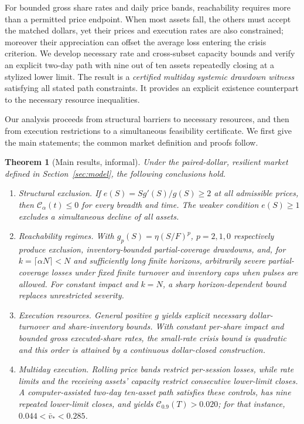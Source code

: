 \documentclass[11pt]{article}
\numberwithin{equation}{section}
\newtheorem{theorem}{Theorem}[section]
\theoremstyle{definition}
\theoremstyle{remark}
\newcommand{\Cris}{\mathcal{C}}
\begin{document}
For bounded gross share rates and daily price bands, reachability requires more than a permitted price endpoint. When most assets fall, the others must accept the matched dollars, yet their prices and execution rates are also constrained; moreover their appreciation can offset the average loss entering the crisis criterion. We develop necessary rate and cross-subset capacity bounds and verify an explicit two-day path with nine out of ten assets repeatedly closing at a stylized lower limit. The result is a \emph{certified multiday systemic drawdown witness} satisfying all stated path constraints. It provides an explicit existence counterpart to the necessary resource inequalities.

Our analysis proceeds from structural barriers to necessary resources, and then from execution restrictions to a simultaneous feasibility certificate. We first give the main statements; the common market definition and proofs follow.

\begin{theorem}[Main results, informal]\label{thm:informal}
Under the paired-dollar, resilient market defined in Section~\ref{sec:model}, the following conclusions hold.
\begin{enumerate}[label=\textup{(\roman*)},leftmargin=2em,itemsep=0.12em]
\item \emph{Structural exclusion.} If $e(S)=Sg'(S)/g(S)\ge2$ at all admissible prices, then $\Cris_\alpha(t)\le0$ for every breadth and time. The weaker condition $e(S)\ge1$ excludes a simultaneous decline of all assets.
\item \emph{Reachability regimes.} With $g_p(S)=\eta(S/F)^p$, $p=2,1,0$ respectively produce exclusion, inventory-bounded partial-coverage drawdowns, and, for $k=\lceil\alpha N\rceil<N$ and sufficiently long finite horizons, arbitrarily severe partial-coverage losses under fixed finite turnover and inventory caps when pulses are allowed. For constant impact and $k=N$, a sharp horizon-dependent bound replaces unrestricted severity.
\item \emph{Execution resources.} General positive $g$ yields explicit necessary dollar-turnover and share-inventory bounds. With constant per-share impact and bounded gross executed-share rates, the small-rate crisis bound is quadratic and this order is attained by a continuous dollar-closed construction.
\item \emph{Multiday execution.} Rolling price bands restrict per-session losses, while rate limits and the receiving assets' capacity restrict consecutive lower-limit closes. A computer-assisted two-day ten-asset path satisfies these controls, has nine repeated lower-limit closes, and yields $\Cris_{0.9}(T)>0.020$; for that instance, $0.044<\bar v_*<0.285$.
\end{enumerate}
\end{theorem}
\end{document}
